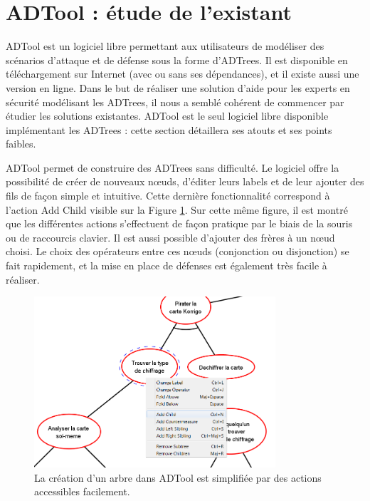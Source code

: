 \section{ADTool : étude de l'existant}
	\label{sec:adtool}

	ADTool est un logiciel libre permettant aux utilisateurs de modéliser des scénarios d'attaque et de défense sous la forme d'ADTrees. Il est disponible en téléchargement sur Internet (avec ou sans ses dépendances), et il existe aussi une version en ligne. Dans le but de réaliser une solution d'aide pour les experts en sécurité modélisant les ADTrees, il nous a semblé cohérent de commencer par étudier les solutions existantes. ADTool est le seul logiciel libre disponible implémentant les ADTrees : cette section détaillera ses atouts et ses points faibles.

	ADTool permet de construire des ADTrees sans difficulté. Le logiciel offre la possibilité de créer de nouveaux nœuds, d'éditer leurs labels et de leur ajouter des fils de façon simple et intuitive. Cette dernière fonctionnalité correspond à l'action \og Add Child \fg{} visible sur la {\sc Figure} \ref{fig:arbre_exemple_1}. Sur cette même figure, il est montré que les différentes actions s'effectuent de façon pratique par le biais de la souris ou de raccourcis clavier. Il est aussi possible d'ajouter des frères à un nœud choisi. Le choix des opérateurs entre ces nœuds (conjonction ou disjonction)  se fait rapidement, et la mise en place de défenses est également très facile à réaliser. 
	
	\begin{figure}[h]
        \centering
        \includegraphics[width=0.8\textwidth]{figure/adtool_add_child.png}
        \caption{La création d'un arbre dans ADTool est simplifiée par des actions accessibles facilement.}
        \label{fig:arbre_exemple_1}
    \end{figure}
	
